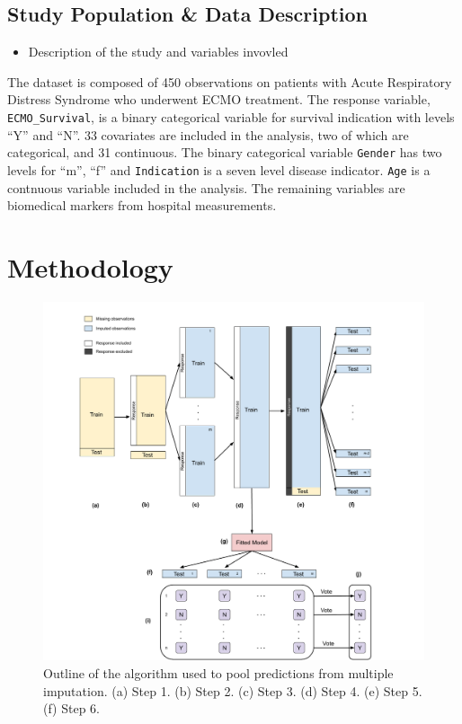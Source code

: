 \documentclass[12pt,]{article}
\providecommand{\tightlist}{%
  \setlength{\itemsep}{0pt}\setlength{\parskip}{0pt}}
\begin{document}
\subsection{Study Population \& Data
Description}\label{study-population-data-description}

\begin{itemize}
\tightlist
\item
  Description of the study and variables invovled
\end{itemize}

The dataset is composed of 450 observations on patients with Acute
Respiratory Distress Syndrome who underwent ECMO treatment. The response
variable, \texttt{ECMO\_Survival}, is a binary categorical variable for
survival indication with levels ``Y'' and ``N''. 33 covariates are
included in the analysis, two of which are categorical, and 31
continuous. The binary categorical variable \texttt{Gender} has two
levels for ``m'', ``f'' and \texttt{Indication} is a seven level disease
indicator. \texttt{Age} is a contnuous variable included in the
analysis. The remaining variables are biomedical markers from hospital
measurements.

\newpage

\section{Methodology}\label{methodology}

\begin{figure}[H]

{\centering \includegraphics[width=1\linewidth]{images/ensemble-imputation} 

}

\caption{\label{fig:ensemble-imputation}Outline of the algorithm used to pool predictions from multiple imputation.  (a) Step 1. (b) Step 2. (c) Step 3. (d) Step 4.  (e) Step 5.  (f) Step 6.}\label{fig:unnamed-chunk-1}
\end{figure}
\end{document}
